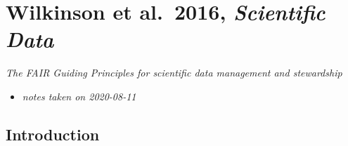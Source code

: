 \documentclass[
]{book}
\providecommand{\tightlist}{%
  \setlength{\itemsep}{0pt}\setlength{\parskip}{0pt}}
\begin{document}
\hypertarget{wilkinson-et-al.-2016-scientific-data}{%
\chapter{\texorpdfstring{Wilkinson et al.~2016, \emph{Scientific Data}}{Wilkinson et al.~2016, Scientific Data}}\label{wilkinson-et-al.-2016-scientific-data}}


\emph{The FAIR Guiding Principles for scientific data management and stewardship} \citep{wilkinson2016fair}

\begin{itemize}
\tightlist
\item
  \emph{notes taken on 2020-08-11}
\end{itemize}

\hypertarget{introduction}{%
\section{Introduction}\label{introduction}}
\end{document}
